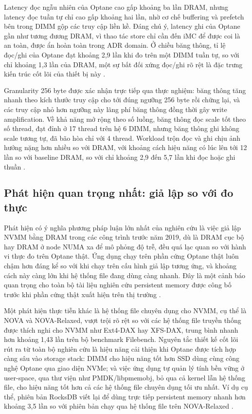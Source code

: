 \documentclass[12pt,a4paper]{article}
\begin{document}
Latency đọc ngẫu nhiên của Optane cao gấp khoảng ba lần DRAM, nhưng latency đọc tuần tự chỉ cao gấp khoảng hai lần, nhờ cơ chế buffering và prefetch bên trong DIMM gộp các truy cập liền kề. Đáng chú ý, latency ghi của Optane gần như tương đương DRAM, vì thao tác store chỉ cần đến iMC để được coi là an toàn, được ẩn hoàn toàn trong ADR domain. Ở chiều băng thông, tỉ lệ đọc/ghi của Optane đạt khoảng 2,9 lần khi đo trên một DIMM tuần tự, so với chỉ khoảng 1,3 lần của DRAM, một sự bất đối xứng đọc/ghi rõ rệt là đặc trưng kiến trúc cốt lõi của thiết bị này \cite{izraelevitz2019}.

Granularity 256 byte được xác nhận trực tiếp qua thực nghiệm: băng thông tăng nhanh theo kích thước truy cập cho tới đúng ngưỡng 256 byte rồi chững lại, và các truy cập nhỏ hơn ngưỡng này lãng phí băng thông đồng thời gây write amplification. Về khả năng mở rộng theo số luồng, băng thông đọc scale tốt theo số thread, đạt đỉnh ở 17 thread trên hệ 6 DIMM, nhưng băng thông ghi không scale tương tự, đã bão hòa chỉ với 4 thread. Workload trộn đọc và ghi chịu ảnh hưởng nặng hơn nhiều so với DRAM, với khoảng cách hiệu năng có lúc lên tới 12 lần so với baseline DRAM, so với chỉ khoảng 2,9 đến 5,7 lần khi đọc hoặc ghi thuần \cite{izraelevitz2019}.

\subsection{Phát hiện quan trọng nhất: giả lập so với đo thực}

Phát hiện có ý nghĩa phương pháp luận lớn nhất của nghiên cứu là việc giả lập NVMM bằng DRAM trong các công trình trước năm 2019, dù là DRAM cục bộ hay DRAM ở node NUMA xa để mô phỏng độ trễ, đều quá lạc quan so với hành vi thực đo trên Optane thật. Ứng dụng chạy trên phần cứng Optane thật luôn chậm hơn đáng kể so với khi chạy trên cấu hình giả lập tương ứng, và khoảng cách này càng lớn khi hệ thống file đang dùng càng nhanh. Đây là một cảnh báo quan trọng cho toàn bộ tài liệu nghiên cứu persistent memory được công bố trước khi phần cứng thật xuất hiện trên thị trường \cite{izraelevitz2019}.

Một phát hiện thực tiễn khác là hệ thống file chuyên dụng cho NVMM, cụ thể là NOVA và NOVA-Relaxed, vượt trội rõ rệt so với các hệ thống file truyền thống được thích nghi cho NVMM như Ext4-DAX hay XFS-DAX, trung bình nhanh hơn khoảng 1,43 lần trên bộ benchmark Filebench. Nguyên tắc thiết kế cốt lõi rút ra từ toàn bộ nghiên cứu là hiệu năng cải thiện khi Optane được tích hợp càng sâu vào storage stack: DIMM cho hiệu năng tốt hơn SSD dùng cùng công nghệ Optane qua giao diện NVMe; và việc ứng dụng tự quản lý tính bền vững ở user-space, qua thư viện như PMDK/libpmemobj, bỏ qua cả kernel lẫn hệ thống file, cho hiệu năng tốt hơn cả các hệ thống file chuyên dụng tối ưu nhất. Ví dụ cụ thể, phiên bản RocksDB viết lại để dùng trực tiếp persistent memory nhanh hơn khoảng 3,5 lần so với phiên bản chạy qua hệ thống file trên NOVA-Relaxed \cite{izraelevitz2019}.
\end{document}
